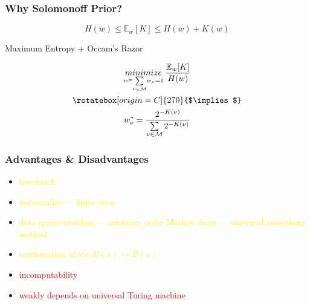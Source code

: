 \documentclass[UTF8,11pt,colorlinks,compress,openany]{beamer}%
\begin{document}
\begin{frame}\frametitle{Why Solomonoff Prior?}
\[H(w)\leq\mathbb{E}_w[K]\leq H(w)+K(w)\]
\begin{block}{}
\centerline{Maximum Entropy + Occam's Razor}
\end{block}
\begin{gather*}
\mathop{minimize}\limits_{w\vDash\sum\limits_{\nu\in\mathcal{M}}\!w_\nu=1} \dfrac{\mathbb{E}_w[K]}{H(w)}\\
\rotatebox[origin=C]{270}{$\implies$}\\
w_\nu^*=\dfrac{2^{-K(\nu)}}{\sum\limits_{\nu\in\mathcal{M}}2^{-K(\nu)}}
\end{gather*}
\end{frame}

\begin{frame}\frametitle{Advantages \& Disadvantages}
	\begin{itemize}
		\item \textcolor{yellow}{free-lunch}
		\item \textcolor{yellow}{universality --- finite error}
		\item \textcolor{yellow}{data sparse problem --- arbitrary order Markov chain --- universal smoothing method}
		\item \textcolor{yellow}{confirmation of $\forall x: R(x)\to B(x)$}
		\item \textcolor{red}{incomputability}
		\item \textcolor{red}{weakly depends on universal Turing machine}
	\end{itemize}
\end{frame}
\end{document}
